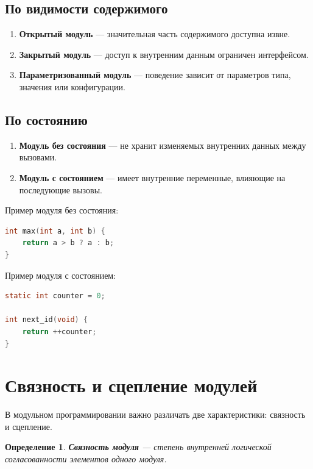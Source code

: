 \documentclass[12pt,a4paper]{article}
\newtheorem{definition}{Определение}
\begin{document}
\subsection{По видимости содержимого}

\begin{enumerate}
  \item \textbf{Открытый модуль} --- значительная часть содержимого доступна извне.
  \item \textbf{Закрытый модуль} --- доступ к внутренним данным ограничен интерфейсом.
  \item \textbf{Параметризованный модуль} --- поведение зависит от параметров типа, значения или конфигурации.
\end{enumerate}

\subsection{По состоянию}

\begin{enumerate}
  \item \textbf{Модуль без состояния} --- не хранит изменяемых внутренних данных между вызовами.
  \item \textbf{Модуль с состоянием} --- имеет внутренние переменные, влияющие на последующие вызовы.
\end{enumerate}

Пример модуля без состояния:

\begin{lstlisting}[language=C]
int max(int a, int b) {
    return a > b ? a : b;
}
\end{lstlisting}

Пример модуля с состоянием:

\begin{lstlisting}[language=C]
static int counter = 0;

int next_id(void) {
    return ++counter;
}
\end{lstlisting}

\section{Связность и сцепление модулей}

В модульном программировании важно различать две характеристики: связность и сцепление.

\begin{definition}
\textbf{Связность модуля} --- степень внутренней логической согласованности элементов одного модуля.
\end{definition}
\end{document}
